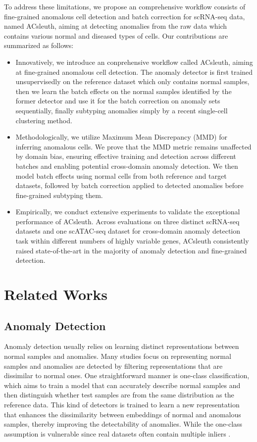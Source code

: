 \documentclass{article}
\begin{document}
To address these limitations, we propose an comprehensive workflow consists of fine-grained anomalous cell 
detection and batch correction for scRNA-seq data, named ACsleuth, aiming at 
detecting anomalies from the raw data which contains various normal and diseased types of 
cells. Our contributions are summarized as follows:
\begin{itemize}
\item Innovatively, we introduce an conprehensive workflow called ACsleuth, aiming at 
fine-grained anomalous cell detection. The anomaly detector is first trained 
unsupervisedly on the reference dataset which only contains normal samples, then we learn 
the batch effects on the normal samples identified by the former detector and use it for 
the batch correction on anomaly sets sequentially, finally subtyping anomalies simply by a recent 
single-cell clustering method.
\item Methodologically, we utilize Maximum Mean Discrepancy (MMD) for inferring anomalous cells. 
We prove that the MMD metric remains unaffected by domain bias, ensuring effective training and  
detection across different batches and enabling potential cross-domain anomaly detection. We then 
model batch effects using normal cells from both reference and target datasets, followed by batch 
correction applied to detected anomalies before fine-grained subtyping them.
\item Empirically, we conduct extensive experiments to validate the exceptional performance 
of ACsleuth. Across evaluations on three distinct scRNA-seq datasets and one scATAC-seq dataset 
for cross-domain anomaly detection task within different numbers of highly variable genes, 
ACsleuth consistently raised state-of-the-art in the majority of anomaly detection and 
fine-grained detection.
\end{itemize}

\section{Related Works}
\subsection{Anomaly Detection}
Anomaly detection usually relies on learning distinct representations between normal 
samples and anomalies. Many studies focus on representing normal samples and 
anomalies are detected by filtering representations that are dissimilar to normal ones. 
One straightforward manner is one-class classification, which aims to train a model that 
can accurately describe normal samples and then distinguish whether test samples are from 
the same distribution as the reference data. This kind of detectors is trained to learn a 
new representation \cite{RCA,liznerski} that 
enhances the dissimilarity between embeddings of normal and anomalous samples, thereby 
improving the detectability of anomalies. While the one-class assumption is vulnerable 
since real datasets often contain multiple inliers \cite{SLAD}.
\end{document}

